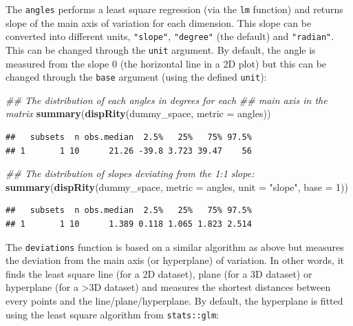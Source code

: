 \documentclass[]{book}
\newenvironment{Shaded}{\begin{snugshade}}{\end{snugshade}}
\newcommand{\CommentTok}[1]{\textcolor[rgb]{0.56,0.35,0.01}{\textit{#1}}}
\newcommand{\DataTypeTok}[1]{\textcolor[rgb]{0.13,0.29,0.53}{#1}}
\newcommand{\DecValTok}[1]{\textcolor[rgb]{0.00,0.00,0.81}{#1}}
\newcommand{\KeywordTok}[1]{\textcolor[rgb]{0.13,0.29,0.53}{\textbf{#1}}}
\newcommand{\NormalTok}[1]{#1}
\newcommand{\StringTok}[1]{\textcolor[rgb]{0.31,0.60,0.02}{#1}}
\begin{document}
The \texttt{angles} performs a least square regression (via the \texttt{lm} function) and returns slope of the main axis of variation for each dimension. This slope can be converted into different units, \texttt{"slope"}, \texttt{"degree"} (the default) and \texttt{"radian"}. This can be changed through the \texttt{unit} argument.
By default, the angle is measured from the slope 0 (the horizontal line in a 2D plot) but this can be changed through the \texttt{base} argument (using the defined \texttt{unit}):

\begin{Shaded}
\begin{Highlighting}[]
\CommentTok{## The distribution of each angles in degrees for each}
\CommentTok{## main axis in the matrix}
\KeywordTok{summary}\NormalTok{(}\KeywordTok{dispRity}\NormalTok{(dummy_space, }\DataTypeTok{metric =}\NormalTok{ angles))}
\end{Highlighting}
\end{Shaded}

\begin{verbatim}
##   subsets  n obs.median  2.5%   25%   75% 97.5%
## 1       1 10      21.26 -39.8 3.723 39.47    56
\end{verbatim}

\begin{Shaded}
\begin{Highlighting}[]
\CommentTok{## The distribution of slopes deviating from the 1:1 slope:}
\KeywordTok{summary}\NormalTok{(}\KeywordTok{dispRity}\NormalTok{(dummy_space, }\DataTypeTok{metric =}\NormalTok{ angles, }\DataTypeTok{unit =} \StringTok{"slope"}\NormalTok{,}
                 \DataTypeTok{base =} \DecValTok{1}\NormalTok{))}
\end{Highlighting}
\end{Shaded}

\begin{verbatim}
##   subsets  n obs.median  2.5%   25%   75% 97.5%
## 1       1 10      1.389 0.118 1.065 1.823 2.514
\end{verbatim}

The \texttt{deviations} function is based on a similar algorithm as above but measures the deviation from the main axis (or hyperplane) of variation.
In other words, it finds the least square line (for a 2D dataset), plane (for a 3D dataset) or hyperplane (for a \textgreater{}3D dataset) and measures the shortest distances between every points and the line/plane/hyperplane.
By default, the hyperplane is fitted using the least square algorithm from \texttt{stats::glm}:
\end{document}
